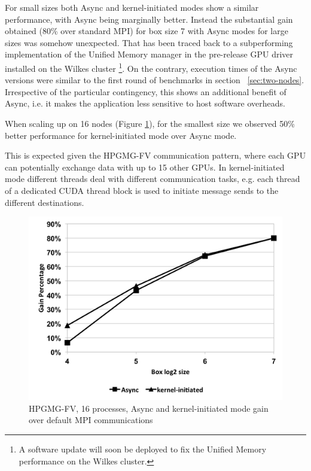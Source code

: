 \documentclass[conference]{IEEEtran}
\begin{document}
For small sizes both Async and kernel-initiated modes show a similar
performance, with Async being marginally better.
% 
Instead the substantial gain obtained (80\% over standard MPI) for box
size 7 with Async modes for large sizes was somehow unexpected.
%
That has been traced back to a subperforming implementation of the Unified
Memory manager in the pre-release GPU driver installed on the Wilkes
cluster
\footnote{A software update will soon be deployed to fix the Unified Memory
  performance on the Wilkes cluster.}.
%
On the contrary, execution times of the Async versions were similar
to the first round of benchmarks in section ~\ref{sec:two-nodes}.
%
Irrespective of the particular contingency, this shows an additional
benefit of Async, i.e. it makes the application less sensitive to
host software overheads.

When scaling up on 16 nodes (Figure \ref{fig:gain_wilkes16}), for the
smallest size we observed 50\% better performance for kernel-initiated mode
over Async mode.
% 

This is expected given the HPGMG-FV communication pattern, where each GPU
can potentially exchange data with up to 15 other GPUs.
%
In kernel-initiated mode different threads deal with different communication
tasks, e.g. each thread of a dedicated CUDA thread block is used to
initiate message sends to the different destinations.



\begin{figure}[h]
\includegraphics[scale=0.5]{gain_wilkes16.png}
\caption{HPGMG-FV, 16 processes, Async and kernel-initiated mode gain over
  default MPI communications}
\label{fig:gain_wilkes16}
\end{figure}
\end{document}
